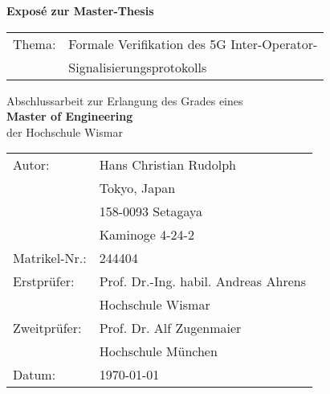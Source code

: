 \begin{titlepage}
\centering

\vspace*{3cm}

{
    \Huge{
        \textbf{Exposé zur Master-Thesis}
    }
}

\vspace{2cm}

\begin{table}[h!]
\centering
\LARGE
\begin{tabular}{ll}
Thema:         & Formale Verifikation des 5G Inter-Operator-\\
               & Signalisierungsprotokolls
\end{tabular}
\end{table}

\vspace{2cm}

\large{
    Abschlussarbeit zur Erlangung des Grades eines\\\vspace{2mm}
    \textbf{Master of Engineering}\\\vspace{2mm}
    der Hochschule Wismar
}

\vfill

\begin{table}[h!]
\centering
\large
\begin{tabular}{ll}
Autor:         & Hans Christian Rudolph               \\
               & Tokyo, Japan                         \\
               & 158-0093 Setagaya                    \\
               & Kaminoge 4-24-2                      \\
Matrikel-Nr.:  & 244404                               \vspace{3mm}\\
Erstprüfer:    & Prof. Dr.-Ing. habil. Andreas Ahrens \\
               & Hochschule Wismar                    \\
Zweitprüfer:   & Prof. Dr. Alf Zugenmaier             \\
               & Hochschule München                   \vspace{3mm}\\
Datum:         & \today
\end{tabular}
\end{table}

\vspace{15mm}

\end{titlepage}
